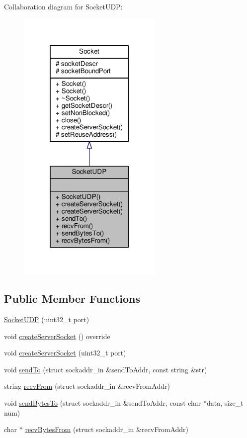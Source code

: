 Collaboration diagram for Socket\-U\-D\-P\-:
\nopagebreak
\begin{figure}[H]
\begin{center}
\leavevmode
\includegraphics[width=198pt]{class_socket_u_d_p__coll__graph}
\end{center}
\end{figure}
\subsection*{Public Member Functions}
\begin{DoxyCompactItemize}
\item 
\hyperlink{class_socket_u_d_p_aa41096c8eecdf55a7557549e8f6a5d4a}{Socket\-U\-D\-P} (uint32\-\_\-t port)
\item 
void \hyperlink{class_socket_u_d_p_aeac93900205bb3c08a90008dfda3585b}{create\-Server\-Socket} () override
\item 
void \hyperlink{class_socket_u_d_p_a48b2c650565eba38d9654ac16d21c60c}{create\-Server\-Socket} (uint32\-\_\-t port)
\item 
void \hyperlink{class_socket_u_d_p_a207c3d7c2b854b140dcb4ca9a9c81292}{send\-To} (struct sockaddr\-\_\-in \&send\-To\-Addr, const string \&str)
\item 
string \hyperlink{class_socket_u_d_p_ad5a3b81f16a9db0db80a92f69c811fe1}{recv\-From} (struct sockaddr\-\_\-in \&recv\-From\-Addr)
\item 
void \hyperlink{class_socket_u_d_p_a69cce05867435fb471a50319855e34fc}{send\-Bytes\-To} (struct sockaddr\-\_\-in \&send\-To\-Addr, const char $\ast$data, size\-\_\-t num)
\item 
char $\ast$ \hyperlink{class_socket_u_d_p_a4c3ff487d034850ad2096339cfa06707}{recv\-Bytes\-From} (struct sockaddr\-\_\-in \&recv\-From\-Addr)
\end{DoxyCompactItemize}
